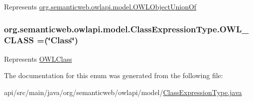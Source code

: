 Represents \hyperlink{interfaceorg_1_1semanticweb_1_1owlapi_1_1model_1_1_o_w_l_object_union_of}{org.\-semanticweb.\-owlapi.\-model.\-O\-W\-L\-Object\-Union\-Of} \hypertarget{enumorg_1_1semanticweb_1_1owlapi_1_1model_1_1_class_expression_type_ad4dbbf88aeb69c00e73559d6deb13c6b}{
\subsubsection[{O\-W\-L\-\_\-\-C\-L\-A\-S\-S}]{\setlength{\rightskip}{0pt plus 5cm}org.\-semanticweb.\-owlapi.\-model.\-Class\-Expression\-Type.\-O\-W\-L\-\_\-\-C\-L\-A\-S\-S =(\char`\"{}Class\char`\"{})}}\label{enumorg_1_1semanticweb_1_1owlapi_1_1model_1_1_class_expression_type_ad4dbbf88aeb69c00e73559d6deb13c6b}
Represents \hyperlink{interfaceorg_1_1semanticweb_1_1owlapi_1_1model_1_1_o_w_l_class}{O\-W\-L\-Class} 

The documentation for this enum was generated from the following file\-:\begin{DoxyCompactItemize}
\item 
api/src/main/java/org/semanticweb/owlapi/model/\hyperlink{_class_expression_type_8java}{Class\-Expression\-Type.\-java}\end{DoxyCompactItemize}
